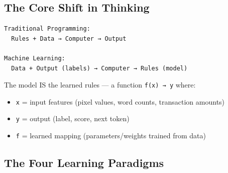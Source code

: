 \documentclass[11pt]{article}
\providecommand{\tightlist}{\setlength{\itemsep}{1pt}\setlength{\parskip}{0pt}}
\begin{document}
\subsection{The Core Shift in Thinking}\label{the-core-shift-in-thinking}

\setcodelang{}

\begin{verbatim}
Traditional Programming:
  Rules + Data → Computer → Output

Machine Learning:
  Data + Output (labels) → Computer → Rules (model)
\end{verbatim}

The model IS the learned rules --- a function \texttt{f(x)\ →\ y} where:

\begin{itemize}
\tightlist
\item
  \texttt{x} = input features (pixel values, word counts, transaction amounts)
\item
  \texttt{y} = output (label, score, next token)
\item
  \texttt{f} = learned mapping (parameters/weights trained from data)
\end{itemize}

\subsection{The Four Learning Paradigms}\label{the-four-learning-paradigms}
\end{document}
